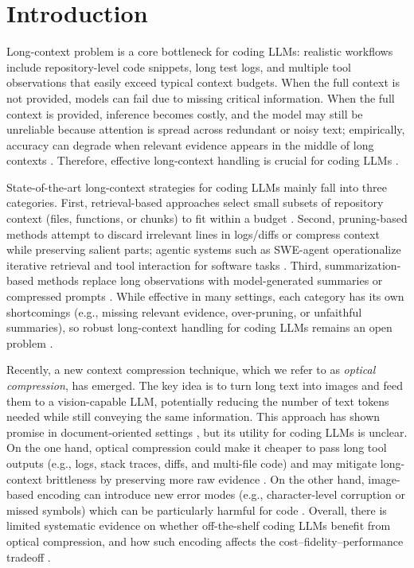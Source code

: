 \section{Introduction}

Long-context problem is a core bottleneck for coding LLMs: realistic workflows include repository-level code snippets, long test logs, and multiple tool observations that easily exceed typical context budgets. When the full context is not provided, models can fail due to missing critical information. When the full context is provided, inference becomes costly, and the model may still be unreliable because attention is spread across redundant or noisy text; empirically, accuracy can degrade when relevant evidence appears in the middle of long contexts \cite{liu2023lost,hsieh2024ruler,bai2023longbench_arxiv}. Therefore, effective long-context handling is crucial for coding LLMs \cite{vaswani2017attention,dao2022flashattention}.

State-of-the-art long-context strategies for coding LLMs mainly fall into three categories. First, retrieval-based approaches select small subsets of repository context (files, functions, or chunks) to fit within a budget \cite{lewis2020rag,karpukhin2020dpr,robertson2009bm25}. Second, pruning-based methods attempt to discard irrelevant lines in logs/diffs or compress context while preserving salient parts; agentic systems such as SWE-agent operationalize iterative retrieval and tool interaction for software tasks \cite{yang2024sweagent,yao2022react,schick2023toolformer}. Third, summarization-based methods replace long observations with model-generated summaries or compressed prompts \cite{jiang2023llmlingua}. While effective in many settings, each category has its own shortcomings (e.g., missing relevant evidence, over-pruning, or unfaithful summaries), so robust long-context handling for coding LLMs remains an open problem \cite{liu2023lost,hsieh2024ruler}.

Recently, a new context compression technique, which we refer to as \emph{optical compression}, has emerged. The key idea is to turn long text into images and feed them to a vision-capable LLM, potentially reducing the number of text tokens needed while still conveying the same information. This approach has shown promise in document-oriented settings \cite{kim2021donut,lee2022pix2struct,openai2023gpt4v_systemcard}, but its utility for coding LLMs is unclear. On the one hand, optical compression could make it cheaper to pass long tool outputs (e.g., logs, stack traces, diffs, and multi-file code) and may mitigate long-context brittleness by preserving more raw evidence \cite{liu2023lost}. On the other hand, image-based encoding can introduce new error modes (e.g., character-level corruption or missed symbols) which can be particularly harmful for code \cite{shi2023gpt4v_ocr}. Overall, there is limited systematic evidence on whether off-the-shelf coding LLMs benefit from optical compression, and how such encoding affects the cost--fidelity--performance tradeoff \cite{wei2025deepseekocr,feng2026agentocr}.


